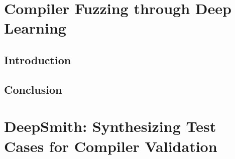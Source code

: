 \ifstapled
\chapter{Compiler Fuzzing through Deep Learning}
\section{Introduction}
\lipsum[1-2]

\section{Conclusion}
\lipsum[1-2]
\else
\chapter{DeepSmith: Synthesizing Test Cases for Compiler Validation}






\fi
